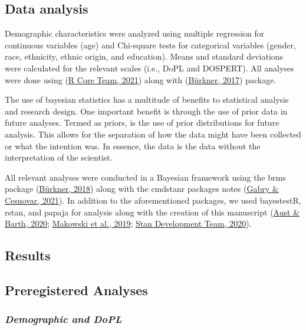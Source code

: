 \documentclass[
  donotrepeattitle,doc, 12pt, a4paper,floatsintext]{apa7}
\begin{document}
\hypertarget{data-analysis-1}{%
\subsection{Data analysis}\label{data-analysis-1}}

Demographic characteristics were analyzed using multiple regression for continuous variables (age) and Chi-square tests for categorical variables (gender, race, ethnicity, ethnic origin, and education). Means and standard deviations were calculated for the relevant scales (i.e., DoPL and DOSPERT). All analyses were done using (\protect\hyperlink{ref-rcoreteam2021}{R Core Team, 2021}) along with (\protect\hyperlink{ref-burkner2017}{Bürkner, 2017}) package.

The use of bayesian statistics has a multitude of benefits to statistical analysis and research design. One important benefit is through the use of prior data in future analyses. Termed as priors, is the use of prior distributions for future analysis. This allows for the separation of how the data might have been collected or what the intention was. In essence, the data is the data without the interpretation of the scientist.

All relevant analyses were conducted in a Bayesian framework using the brms package (\protect\hyperlink{ref-burkner2018}{Bürkner, 2018}) along with the cmdstanr packages notes (\protect\hyperlink{ref-gabry2021}{Gabry \& Cesnovar, 2021}). In addition to the aforementioned packages, we used bayestestR, rstan, and papaja for analysis along with the creation of this manuscript (\protect\hyperlink{ref-aust2020}{Aust \& Barth, 2020}; \protect\hyperlink{ref-makowski2019}{Makowski et al., 2019}; \protect\hyperlink{ref-standevelopmentteam2020}{Stan Development Team, 2020}).

\hypertarget{results}{%
\subsection{Results}\label{results}}

\hypertarget{preregistered-analyses}{%
\subsection{Preregistered Analyses}\label{preregistered-analyses}}

\hypertarget{demographic-and-dopl}{%
\subsubsection{\texorpdfstring{\emph{Demographic and DoPL}}{Demographic and DoPL}}\label{demographic-and-dopl}}
\end{document}
